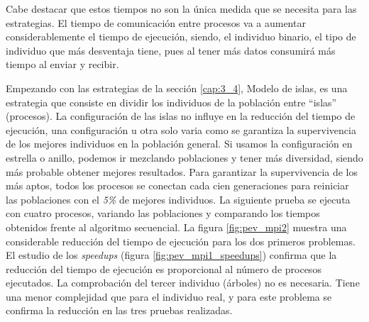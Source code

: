 		
		
		
		Cabe destacar que estos tiempos no son la única medida que se necesita para las estrategias. El tiempo de comunicación entre procesos va a aumentar considerablemente el tiempo de ejecución, siendo, el individuo binario, el tipo de individuo que más desventaja tiene, pues al tener más datos consumirá más tiempo al enviar y recibir.
		




		Empezando con las estrategias de la sección \ref{cap:3_4}, Modelo de islas, es una estrategia que consiste en dividir los individuos de la población entre ``islas'' (procesos). La configuración de las islas no influye en la reducción del tiempo de ejecución, una configuración u otra solo varia como se garantiza la supervivencia de los mejores individuos en la población general. Si usamos la configuración en estrella o anillo, podemos ir mezclando poblaciones y tener más diversidad, siendo más probable obtener mejores resultados. Para garantizar la supervivencia de los más aptos, todos los procesos se conectan cada cien generaciones para reiniciar las poblaciones con el \textit{5\%} de mejores individuos. La siguiente prueba se ejecuta con cuatro procesos, variando las poblaciones y comparando los tiempos obtenidos frente al algoritmo secuencial. La figura \ref{fig:pev_mpi2} muestra una considerable reducción del tiempo de ejecución para los dos primeros problemas. El estudio de los \textit{speedups} (figura \ref{fig:pev_mpi1_speedups}) confirma que la reducción del tiempo de ejecución es proporcional al número de procesos ejecutados. La comprobación del tercer individuo (árboles) no es necesaria. Tiene una menor complejidad que para el individuo real, y para este problema se confirma la reducción en las tres pruebas realizadas.
		
			
		
